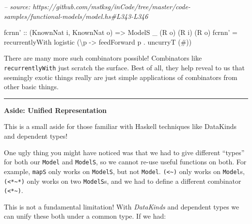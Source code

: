 \documentclass[]{article}
\newenvironment{Shaded}{}{}
\newcommand{\CommentTok}[1]{\textcolor[rgb]{0.38,0.63,0.69}{\textit{#1}}}
\newcommand{\DataTypeTok}[1]{\textcolor[rgb]{0.56,0.13,0.00}{#1}}
\newcommand{\FunctionTok}[1]{\textcolor[rgb]{0.02,0.16,0.49}{#1}}
\newcommand{\NormalTok}[1]{#1}
\newcommand{\OtherTok}[1]{\textcolor[rgb]{0.00,0.44,0.13}{#1}}
\begin{document}
\begin{Shaded}
\begin{Highlighting}[]
\CommentTok{-- source: https://github.com/mstksg/inCode/tree/master/code-samples/functional-models/model.hs#L343-L346}

\NormalTok{fcrnn'}
\OtherTok{    ::}\NormalTok{ (}\DataTypeTok{KnownNat}\NormalTok{ i, }\DataTypeTok{KnownNat}\NormalTok{ o)}
    \OtherTok{=>} \DataTypeTok{ModelS}\NormalTok{ _ (}\DataTypeTok{R}\NormalTok{ o) (}\DataTypeTok{R}\NormalTok{ i) (}\DataTypeTok{R}\NormalTok{ o)}
\NormalTok{fcrnn' }\FunctionTok{=}\NormalTok{ recurrentlyWith logistic (\textbackslash{}p }\OtherTok{->}\NormalTok{ feedForward p }\FunctionTok{.}\NormalTok{ uncurryT (}\FunctionTok{#}\NormalTok{))}
\end{Highlighting}
\end{Shaded}

There are many more such combinators possible! Combinators like
\texttt{recurrentlyWith} just scratch the surface. Best of all, they help reveal
to us that seemingly exotic things really are just simple applications of
combinators from other basic things.

\begin{center}\rule{0.5\linewidth}{\linethickness}\end{center}

\textbf{Aside: Unified Representation}

This is a small aside for those familiar with Haskell techniques like DataKinds
and dependent types!

One ugly thing you might have noticed was that we had to give different
``types'' for both our \texttt{Model} and \texttt{ModelS}, so we cannot re-use
useful functions on both. For example, \texttt{mapS} only works on
\texttt{ModelS}, but not \texttt{Model}. \texttt{(\textless{}\textasciitilde{})}
only works on \texttt{Model}s, \texttt{(\textless{}*\textasciitilde{}*)} only
works on two \texttt{ModelS}s, and we had to define a different combinator
\texttt{(\textless{}*\textasciitilde{})}.

This is not a fundamental limitation! With \emph{DataKinds} and dependent types
we can unify these both under a common type. If we had:
\end{document}

